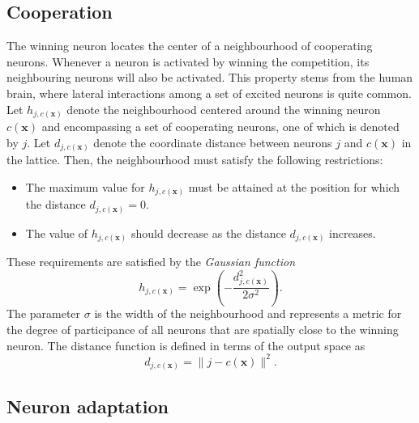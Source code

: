 \documentclass[english]{lni}
\begin{document}
\subsection{Cooperation}
The winning neuron locates the center of a neighbourhood of cooperating neurons.
Whenever a neuron is activated by winning the competition, its neighbouring neurons 
will also be activated. This property stems from the human brain, where lateral 
interactions among a set of excited neurons is quite common.\\
Let $h_{j, c(\mathbf{x})}$ denote the neighbourhood centered around the winning 
neuron $c(\mathbf{x})$ and encompassing a set of cooperating neurons, one of which 
is denoted by $j$. 
Let $d_{j, c(\mathbf{x})}$ denote the coordinate distance between neurons $j$ and $c(\mathbf{x})$
in the lattice. 
Then, the neighbourhood must satisfy the following restrictions:
\begin{itemize}
    \item The maximum value for $h_{j, c(\mathbf{x})}$ must be attained 
    at the position for which the distance $d_{j, c(\mathbf{x})} = 0$.
    \item The value of $h_{j, c(\mathbf{x})}$ should decrease as 
    the distance $d_{j, c(\mathbf{x})}$ increases. 
\end{itemize}
These requirements are satisfied by the \textit{Gaussian function}
\begin{equation}
    h_{j, c(\mathbf{x})} = \exp({-\frac{{d_{j, c(\mathbf{x})}^{2}}}{2\sigma^{2}}}).
\end{equation}
The parameter $\sigma$ is the width of the neighbourhood and represents 
a metric for the degree of participance of all neurons that are spatially close 
to the winning neuron. 
The distance function is defined in terms of the output space as 
\begin{equation}
    d_{j, c(\mathbf{x})} = \|j-c(\mathbf{x})\|^{2}.
\end{equation}
\subsection{Neuron adaptation}

\end{document}

